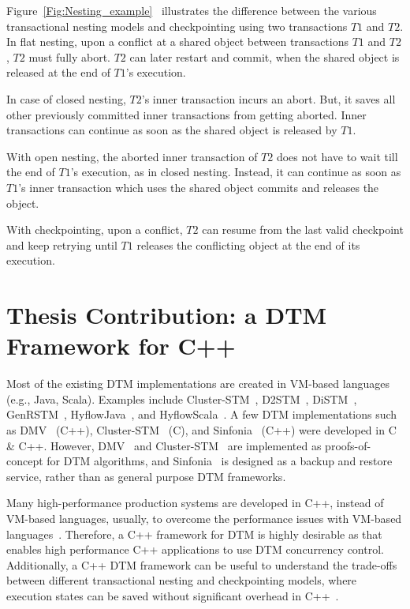 \documentclass[12pt,english]{report}
\begin{document}
Figure~\ref{Fig:Nesting_example}~\cite{Alex:ONTFA2367601} illustrates the difference between the various transactional nesting models and checkpointing using two transactions $T1$ and $T2$. In flat nesting, upon a conflict at a shared object between transactions $T1$ and $T2$, $T2$ must fully abort. $T2$ can later restart and commit, when the shared object is released at the end of $T1$'s execution. 

In case of closed nesting, $T2$'s inner transaction incurs an abort. But, it saves all other previously committed inner transactions from getting aborted. Inner transactions can continue as soon as the shared object is released by $T1$. 

With open nesting, the aborted inner transaction of $T2$ does not have to wait till the end of $T1$'s execution, as in closed nesting. Instead, it can continue as soon as $T1$'s inner transaction which uses the shared object commits and releases the object. 

With checkpointing, upon a conflict, $T2$ can resume from the last valid checkpoint and keep retrying until $T1$ releases the conflicting object at the end of its execution. 

\section{Thesis Contribution: a DTM Framework for C++}

Most of the existing DTM implementations are created in VM-based languages (e.g., Java, Scala). Examples include Cluster-STM~\cite{Bocchino:2008:STM:1345206.1345242}, D2STM~\cite{D2STM:5368778}, DiSTM~\cite{Kotselidis08distm:a}, GenRSTM~\cite{GenRSTM:6038614}, HyflowJava~\cite{Saad:2011:HHP:1996130.1996167}, and HyflowScala~\cite{turcuhyflow2}. A few DTM implementations such as DMV~\cite{Manassiev:2006:EDV:1122971.1123002} (C++), Cluster-STM~\cite{Bocchino:2008:STM:1345206.1345242} (C), and Sinfonia~\cite{Aguilera:2009:SNP:1629087.1629088} (C++)  were developed in C \& C++. However, DMV~\cite{Manassiev:2006:EDV:1122971.1123002} and Cluster-STM~\cite{Bocchino:2008:STM:1345206.1345242}  are implemented as proofs-of-concept for  DTM algorithms, and Sinfonia~\cite{Aguilera:2009:SNP:1629087.1629088} is designed as a backup and restore service, rather than as general purpose DTM frameworks. 


Many high-performance production systems are developed in C++, instead of VM-based languages, usually, to overcome the performance issues with VM-based languages~\cite{hundt2011loop}. Therefore, a C++ framework for DTM is highly desirable as that enables high performance C++ applications to use DTM concurrency control. Additionally, a C++ DTM framework can be useful to understand the trade-offs between different transactional nesting and checkpointing models, where execution states can be saved without significant overhead in C++~\cite{continuation:wiki}. 
\end{document}
